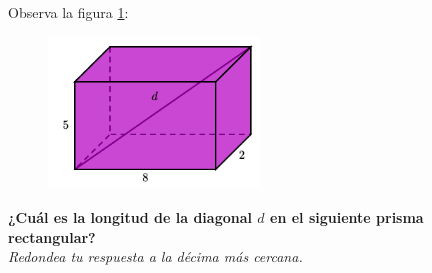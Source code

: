Observa la figura \ref{fig:pitagoras3D_diag_04}:
\begin{figure}[H]
    \begin{center}
        \includegraphics[width=0.5\textwidth]{../images/pitagoras3D_diag_04.png}
    \end{center}
    \caption{}
    \label{fig:pitagoras3D_diag_04}
\end{figure}
\textbf{¿Cuál es la longitud de la diagonal $d$ en el siguiente prisma rectangular?}\\
\textit{Redondea tu respuesta a la décima más cercana.}